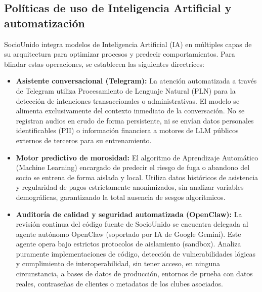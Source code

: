 \subsection{Políticas de uso de Inteligencia Artificial y automatización}
SocioUnido integra modelos de Inteligencia Artificial (IA) en múltiples capas de su arquitectura para optimizar procesos y predecir comportamientos. Para blindar estas operaciones, se establecen las siguientes directrices:

\begin{itemize}
    \item \textbf{Asistente conversacional (Telegram):} La atención automatizada a través de Telegram utiliza Procesamiento de Lenguaje Natural (PLN) para la detección de intenciones transaccionales o administrativas. El modelo se alimenta exclusivamente del contexto inmediato de la conversación. No se registran audios en crudo de forma persistente, ni se envían datos personales identificables (PII) o información financiera a motores de LLM públicos externos de terceros para su entrenamiento.
    \item \textbf{Motor predictivo de morosidad:} El algoritmo de Aprendizaje Automático (Machine Learning) encargado de predecir el riesgo de fuga o abandono del socio se entrena de forma aislada y local. Utiliza datos históricos de asistencia y regularidad de pagos estrictamente anonimizados, sin analizar variables demográficas, garantizando la total ausencia de sesgos algorítmicos.
    \item \textbf{Auditoría de calidad y seguridad automatizada (OpenClaw):} La revisión continua del código fuente de SocioUnido se encuentra delegada al agente autónomo OpenClaw (soportado por IA de Google Gemini). Este agente opera bajo estrictos protocolos de aislamiento (sandbox). Analiza puramente implementaciones de código, detección de vulnerabilidades lógicas y cumplimiento de interoperabilidad, sin tener acceso, en ninguna circunstancia, a bases de datos de producción, entornos de prueba con datos reales, contraseñas de clientes o metadatos de los clubes asociados.
\end{itemize}
